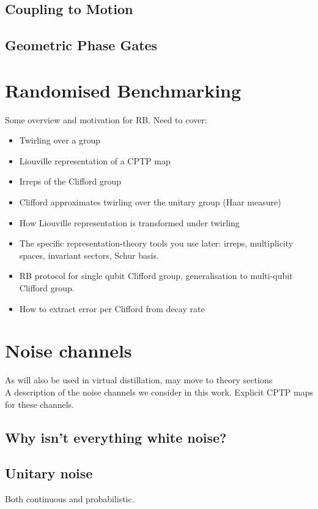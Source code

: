 \subsection{Coupling to Motion}
\label{sec:Motional Coupling}
\subsection{Geometric Phase Gates}
\label{sec:Geometric Phase Gates}
%
\section{Randomised Benchmarking}
Some overview and motivation for RB.
    Need to cover:
    \begin{itemize}
        \item Twirling over a group
        \item Liouville representation of a CPTP map
        \item Irreps of the Clifford group
        \item Clifford approximates twirling over the unitary group (Haar measure)
        \item How Liouville representation is transformed under twirling
        \item The specific representation-theory tools you use later: irreps, multiplicity spaces, invariant sectors, Schur basis.\\
        \item RB protocol for single qubit Clifford group, generalisation to multi-qubit Clifford group.
        \item How to extract error per Clifford from decay rate
\end{itemize}

\section{Noise channels}
    As will also be used in virtual distillation, may move to theory sections\\
    A description of the noise channels we consider in this work. Explicit CPTP maps for these channels.
    \subsection{Why isn't everything white noise?}
    \subsection{Unitary noise}
        Both continuous and probabilistic.
